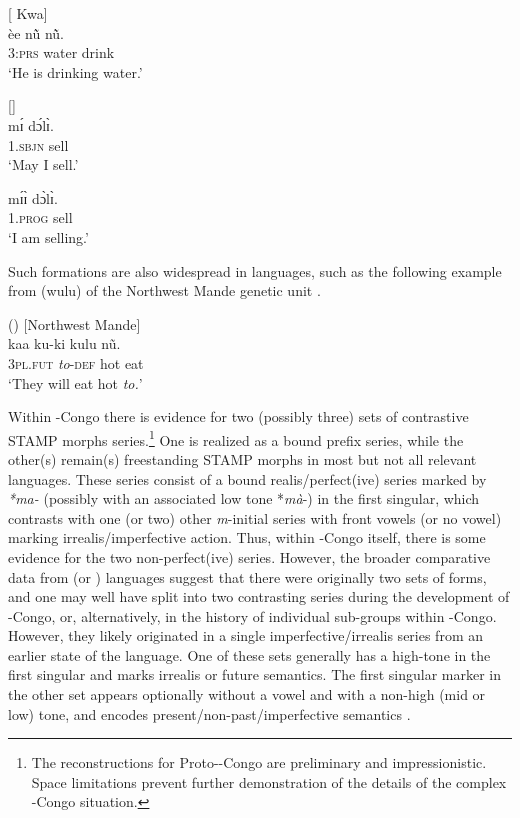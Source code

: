\documentclass[output=paper]{langsci/langscibook}
\begin{document}
\ea\label{ex:anderson:68}
 \citep[105]{Kropp1988}          [ Kwa]  \\
\gll èe     n\`{\~u}  n\`{\~u}.  \\
3\textsc{:prs}  water  drink\\
\glt `He is drinking water.'
\z

\ea\label{ex:anderson:69}
 \citep[193]{Elders2007}            []\\
\ea\label{ex:anderson:69a}
\gll m\'ɪ   d\'ɔl\`ɪ.\\
  \textsc{1.sbjn}  sell\\
\glt `May I sell.'    

\ex \label{ex:anderson:69b}
\gll   m\'ɪ\`ɪ   d\`ɔl\`ɪ.\\
  1.\textsc{prog}  sell\\
  \glt `I am selling.'  
\z
\z

Such formations are also widespread in  languages, such as the following example from (wulu) of the Northwest Mande genetic unit .

\ea\label{ex:anderson:70}
 () \citep[11]{Kim2002}          [Northwest Mande]  \\
\gll kaa    ku-ki  kulu  n\~u.  \\
\textsc{3pl.fut}  \textit{to}-\textsc{def}  hot  eat    \\
\glt `They will eat hot \textit{to.}'        
\z

Within -Congo there is evidence for two (possibly three) sets of contrastive STAMP morphs series.\footnote{The reconstructions for Proto--Congo are preliminary and impressionistic. Space limitations prevent further demonstration of the details of the complex -Congo situation.} One is realized as a bound prefix series, while the other(s) remain(s) freestanding STAMP morphs in most but not all relevant languages. These series consist of a bound realis/perfect(ive) series marked by \textit{*}\textit{ma-} (possibly with an associated low tone *\textit{mà}-) in the first singular, which contrasts with one (or two) other \textit{m}-initial series with front vowels (or no vowel) marking irrealis/imperfective action. Thus, within -Congo itself, there is some evidence for the two non-perfect(ive) series. However, the broader comparative data from  (or ) languages suggest that there were originally two sets of forms, and one may well have split into two contrasting series during the development of -Congo, or, alternatively, in the history of individual sub-groups within -Congo. However, they likely originated in a single imperfective/irrealis series from an earlier state of the language. One of these sets generally has a high-tone in the first singular and marks irrealis or future semantics. The first singular marker in the other set appears optionally without a vowel and with a non-high (mid or low) tone, and encodes present/non-past/imperfective semantics .
\end{document}
